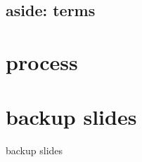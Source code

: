 \subsection{aside: terms}


\section{process}


\section{backup slides}
\begin{frame}{backup slides}
\end{frame}




